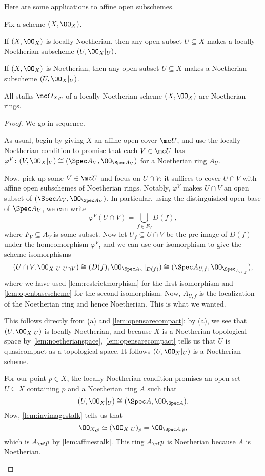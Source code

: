 \documentclass[../notes.tex]{subfiles}
\begin{document}
Here are some applications to affine open subschemes.
\begin{lemma}
	Fix a scheme $(X,\OO_X)$.
	\begin{listalph}
		\item If $(X,\OO_X)$ is locally Noetherian, then any open subset $U\subseteq X$ makes a locally Noetherian subscheme $(U,\OO_X|_U)$.
		\item If $(X,\OO_X)$ is Noetherian, then any open subset $U\subseteq X$ makes a Noetherian subscheme $(U,\OO_X|_U)$.
		\item All stalks $\mc O_{X,p}$ of a locally Noetherian scheme $(X,\OO_X)$ are Noetherian rings.
	\end{listalph}
\end{lemma}
\begin{proof}
	We go in sequence.
	\begin{listalph}
		\item As usual, begin by giving $X$ an affine open cover $\mc U$, and use the locally Noetherian condition to promise that each $V\in\mc U$ has $\varphi^V\colon(V,\OO_X|_V)\cong(\Spec A_V,\OO_{\Spec A_V})$ for a Noetherian ring $A_U$.

		Now, pick up some $V\in\mc U$ and focus on $U\cap V$; it suffices to cover $U\cap V$ with affine open subschemes of Noetherian rings. Notably, $\varphi^V$ makes $U\cap V$ an open subset of $(\Spec A_V,\OO_{\Spec A_V})$. In particular, using the distinguished open base of $\Spec A_V$, we can write
		\[\varphi^V(U\cap V)=\bigcup_{f\in F_V}D(f),\]
		where $F_V\subseteq A_V$ is some subset. Now let $U_f\subseteq U\cap V$ be the pre-image of $D(f)$ under the homeomorphism $\varphi^V$, and we can use our isomorphism to give the scheme isomorphisms
		\[(U\cap V,\OO_X|_U|_{U\cap V})\cong(D(f),\OO_{\Spec A_U}|_{D(f)})\cong(\Spec A_{U,f},\OO_{\Spec_{A_{U,f}}}),\]
		where we have used \autoref{lem:restrictmorphism} for the first isomorphism and \autoref{lem:openbasescheme} for the second isomorphism. Now, $A_{U,f}$ is the localization of the Noetherian ring and hence Noetherian. This is what we wanted.

		\item This follows directly from (a) and \autoref{lem:opensarecompact}: by (a), we see that $(U,\OO_X|_U)$ is locally Noetherian, and because $X$ is a Noetherian topological space by \autoref{lem:noetherianspace}, \autoref{lem:opensarecompact} tells us that $U$ is quasicompact as a topological space. It follows $(U,\OO_X|_U)$ is a Noetherian scheme.

		\item For our point $p\in X$, the locally Noetherian condition promises an open set $U\subseteq X$ containing $p$ and a Noetherian ring $A$ such that
		\[(U,\OO_X|_U)\cong(\Spec A,\OO_{\Spec A}).\]
		Now, \autoref{lem:invimagestalk} tells us that
		\[\OO_{X,p}\simeq(\OO_X|_U)_p=\OO_{\Spec A,p},\]
		which is $A_\mf p$ by \autoref{lem:affinestalk}. This ring $A_\mf p$ is Noetherian because $A$ is Noetherian.
		\qedhere
	\end{listalph}
\end{proof}
\end{document}
